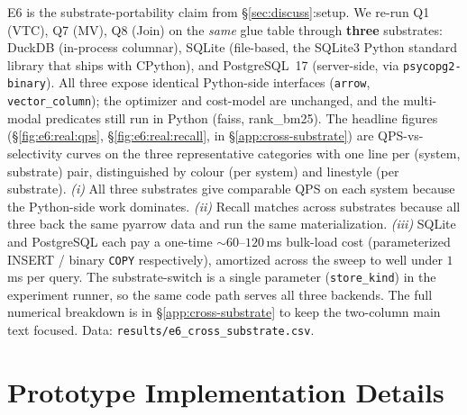 \documentclass[sigconf]{acmart}
\theoremstyle{plain}
\theoremstyle{definition}
\theoremstyle{remark}
\begin{document}
E6 is the substrate-portability claim from \S\ref{sec:discuss}:setup.
We re-run Q1 (VTC), Q7 (MV), Q8 (Join) on the \emph{same} glue
table through \textbf{three} substrates: DuckDB
(in-process columnar), SQLite (file-based, the SQLite3
Python standard library that ships with CPython), and
PostgreSQL~17 (server-side, via \texttt{psycopg2-binary}).
All three expose identical Python-side interfaces
(\texttt{arrow}, \texttt{vector\_column}); the optimizer and
cost-model are unchanged, and the multi-modal predicates still
run in Python (faiss, rank\_bm25). The headline figures
(\S\ref{fig:e6:real:qps}, \S\ref{fig:e6:real:recall}, in
\S\ref{app:cross-substrate}) are QPS-vs-selectivity curves on
the three representative categories with one line per
(system, substrate) pair, distinguished by colour (per
system) and linestyle (per substrate). \emph{(i)} All three
substrates give comparable QPS on each system because the
Python-side work dominates. \emph{(ii)} Recall matches
across substrates because all three back the same pyarrow
data and run the same materialization. \emph{(iii)} SQLite
and PostgreSQL each pay a one-time $\sim 60$--$120$\,ms
bulk-load cost (parameterized INSERT / binary \texttt{COPY}
respectively), amortized across the sweep to well under
$1$\,ms per query. The substrate-switch is a single
parameter (\texttt{store\_kind}) in the experiment runner,
so the same code path serves all three backends. The full
numerical breakdown is in \S\ref{app:cross-substrate} to
keep the two-column main text focused. Data:
\texttt{results/e6\_cross\_substrate.csv}.





\appendix
\renewcommand{\thesection}{\Alph{section}}
\setcounter{section}{0}
\section{Prototype Implementation Details}\label{app:proto}
\end{document}
